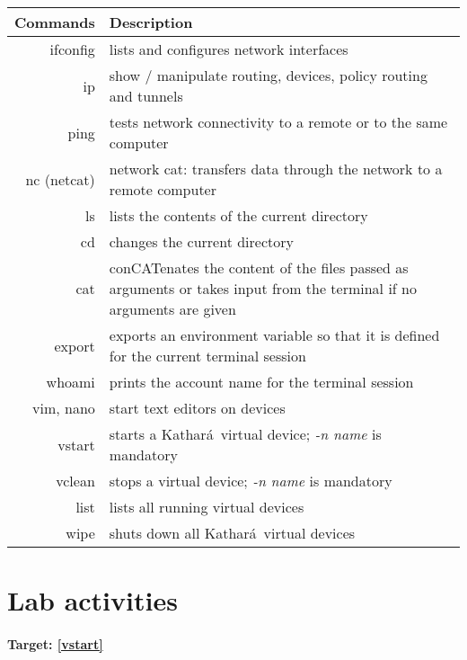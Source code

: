 \documentclass[12pt]{book}
\newcommand{\kathara}{Kathar\'a}
\begin{document}
\begin{tabularx}{\textwidth}{r  X}
  Commands & Description \\ \midrule
  ifconfig & lists and configures network interfaces \\
  ip & show / manipulate routing, devices, policy routing and tunnels \\
  ping & tests network connectivity to a remote or to the same computer \\
  nc (netcat) & network cat: transfers data through the network to a remote computer \\ \midrule

  ls & lists the contents of the current directory \\
  cd & changes the current directory \\
  cat & conCATenates the content of the files passed as arguments or takes input from the terminal if no arguments are given \\
  export & exports an environment variable so that it is defined for the current terminal session \\
  whoami & prints the account name for the terminal session\\
  vim, nano & start text editors on devices \\ \midrule
  vstart & starts a \kathara\ virtual device; \emph{-n name} is mandatory \\
  vclean & stops a virtual device;  \emph{-n name} is mandatory \\
  list & lists all running virtual devices \\
  wipe & shuts down all \kathara\ virtual devices\\
\end{tabularx}



\section{Lab activities}

\paragraph{Target: \ref{vstart}}
\end{document}
